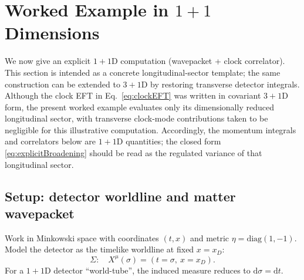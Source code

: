 \documentclass[11pt, a4paper]{article}
\theoremstyle{definition}
\theoremstyle{plain}
\theoremstyle{remark}
\numberwithin{equation}{section}
\newcommand{\dd}{\mathrm{d}}
\newcommand{\Sig}{\Sigma}
\begin{document}
    \section[Worked Example in 1+1 Dimensions]{Worked Example in $1+1$ Dimensions}\label{sec:worked-example}
    
    We now give an explicit $1+1$D computation (wavepacket + clock correlator). This section is intended as a concrete longitudinal-sector template; the same construction can be extended to $3+1$D by restoring transverse detector integrals. Although the clock EFT in Eq.~\eqref{eq:clockEFT} was written in covariant $3+1$D form, the present worked example evaluates only its dimensionally reduced longitudinal sector, with transverse clock-mode contributions taken to be negligible for this illustrative computation. Accordingly, the momentum integrals and correlators below are $1+1$D quantities; the closed form \eqref{eq:explicitBroadening} should be read as the regulated variance of that longitudinal sector.
    
    \subsection{Setup: detector worldline and matter wavepacket}
        
        Work in Minkowski space with coordinates $(t,x)$ and metric $\eta=\mathrm{diag}(1,-1)$. Model the detector as the timelike worldline at fixed $x=x_D$:
        \begin{equation}
            \Sig:\quad X^\mu(\sigma)=(t=\sigma,\ x=x_D).
        \end{equation}
        For a $1+1$D detector ``world-tube'', the induced measure reduces to $\dd\sigma=\dd t$.
        
\end{document}
